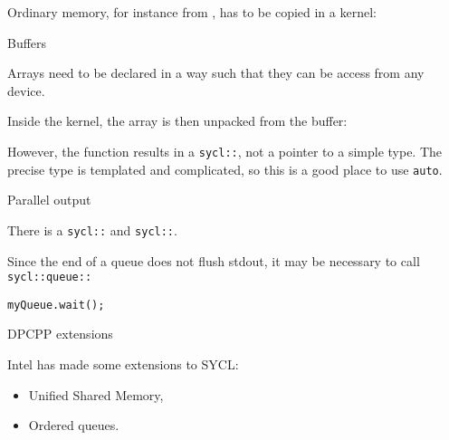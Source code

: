 Ordinary memory, for instance from ,
has to be copied in a kernel:

 {Buffers}

Arrays need to be declared in a way such that they can be
access from any device.


Inside the kernel, the array is then unpacked from the buffer:


However, the  function results
in a \lstinline+sycl::+, not a pointer to a simple type.
The precise type is templated and complicated, so this 
is a good place to use \lstinline+auto+.

 {Parallel output}

There is a \lstinline+sycl::+ and \lstinline+sycl::+.


Since the end of a queue does not flush stdout,
it may be necessary to call
\lstinline+sycl::queue::+
\begin{lstlisting}
myQueue.wait();  
\end{lstlisting}

 {DPCPP extensions}

Intel has made some extensions to SYCL:
\begin{itemize}
\item Unified Shared Memory,
\item Ordered queues.
\end{itemize}
